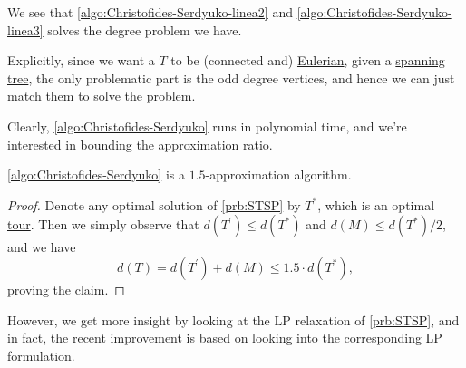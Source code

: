 \begin{remark}
	We see that \autoref{algo:Christofides-Serdyuko-linea2} and \autoref{algo:Christofides-Serdyuko-linea3} solves the degree problem we have.
\end{remark}
\begin{explanation}
	Explicitly, since we want a \(T\) to be (connected and) \href{https://en.wikipedia.org/wiki/Eulerian_path}{Eulerian}, given a \hyperref[def:spanning-tree]{spanning tree}, the only problematic part is the odd degree vertices, and hence we can just match them to solve the problem.
\end{explanation}

Clearly, \autoref{algo:Christofides-Serdyuko} runs in polynomial time, and we're interested in bounding the approximation ratio.

\begin{theorem}\label{thm:lec12-2}
	\autoref{algo:Christofides-Serdyuko} is a \(1.5\)-approximation algorithm.
\end{theorem}
\begin{proof}
	Denote any optimal solution of \autoref{prb:STSP} by \(T^{\ast} \), which is an optimal \hyperref[def:tour]{tour}. Then we simply observe that \(d(T^\prime ) \leq d(T^{\ast} )\) and \(d(M) \leq d(T^{\ast} ) / 2\), and we have
	\[
		d(T) = d(T^\prime ) + d(M) \leq 1.5\cdot d(T^{\ast} ),
	\]
	proving the claim.
\end{proof}

However, we get more insight by looking at the LP relaxation of \autoref{prb:STSP}, and in fact, the recent improvement is based on looking into the corresponding LP formulation.

